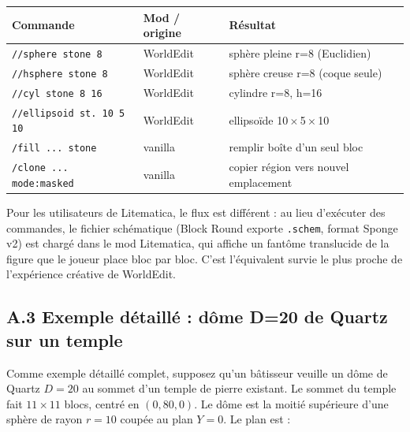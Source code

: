 \documentclass[12pt,a4paper]{scrartcl}
\newcommand{\code}[1]{\texttt{\small #1}}
\newcommand{\cmd}[1]{\textcolor{earth}{\texttt{\small #1}}}
\begin{document}
\vspace{0.4em}
\begin{center}
\small
\begin{tabularx}{\textwidth}{@{}llX@{}}
\toprule
\textbf{Commande} & \textbf{Mod / origine} & \textbf{Résultat} \\
\midrule
\cmd{//sphere stone 8}     & WorldEdit & sphère pleine r=8 (Euclidien)  \\
\cmd{//hsphere stone 8}    & WorldEdit & sphère creuse r=8 (coque seule)  \\
\cmd{//cyl stone 8 16}     & WorldEdit & cylindre r=8, h=16  \\
\cmd{//ellipsoid st. 10 5 10} & WorldEdit & ellipsoïde 10\,$\times$\,5\,$\times$\,10  \\
\cmd{/fill ... stone}      & vanilla & remplir boîte d'un seul bloc  \\
\cmd{/clone ... mode:masked} & vanilla & copier région vers nouvel emplacement  \\
\bottomrule
\end{tabularx}
\end{center}

Pour les utilisateurs de Litematica, le flux est différent : au lieu d'exécuter des commandes, le fichier schématique (Block Round exporte \code{.schem}, format Sponge v2) est chargé dans le mod Litematica, qui affiche un fantôme translucide de la figure que le joueur place bloc par bloc. C'est l'équivalent survie le plus proche de l'expérience créative de WorldEdit.

\subsection*{A.3 Exemple détaillé : dôme D=20 de Quartz sur un temple}
Comme exemple détaillé complet, supposez qu'un bâtisseur veuille un dôme de Quartz $D=20$ au sommet d'un temple de pierre existant. Le sommet du temple fait $11 \times 11$ blocs, centré en $(0,80,0)$. Le dôme est la moitié supérieure d'une sphère de rayon $r=10$ coupée au plan $Y=0$. Le plan est :
\end{document}
